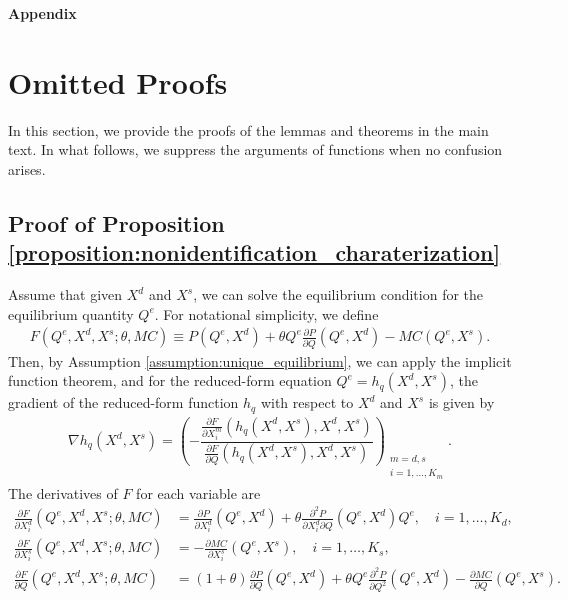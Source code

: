 \documentclass[11pt, a4paper]{article}
\theoremstyle{remark}
\begin{document}
\begin{center}
\huge\textbf{Appendix}
\end{center}
\vspace{1mm}

\section{Omitted Proofs}\label{appendix:proof}
In this section, we provide the proofs of the lemmas and theorems in the main text.
In what follows, we suppress the arguments of functions when no confusion arises.


\subsection{Proof of Proposition \ref{proposition:nonidentification_charaterization}}
Assume that given $X^{d}$ and $X^{s}$, we can solve the equilibrium condition for the equilibrium quantity $Q^e$.
For notational simplicity, we define
\begin{align}
    F(Q^e, X^{d}, X^{s}; \theta, MC) \equiv P(Q^e, X^{d}) + \theta Q^e\frac{\partial P}{\partial Q}(Q^e, X^{d}) - MC(Q^e, X^{s}).
\end{align}
Then, by Assumption \ref{assumption:unique_equilibrium}, we can apply the implicit function theorem, and for the reduced-form equation $Q^e = h_q(X^{d}, X^{s})$, the gradient of the reduced-form function $h_q$ with respect to $X^{d}$ and $X^{s}$ is given by
\begin{align}
    \nabla h_q(X^{d}, X^{s}) =  \left( -\dfrac{\frac{\partial F}{\partial X^{m}_{i}}(h_q(X^{d}, X^{s}), X^{d}, X^{s})}{\frac{\partial F}{\partial Q}(h_q(X^{d}, X^{s}), X^{d}, X^{s})} \right)_{\substack{m = d, s\\ i = 1, \ldots, K_m}}. \label{eq:foc_derivative_demand_supply}
\end{align}
The derivatives of $F$ for each variable are
\begin{align}
    \frac{\partial F}{\partial X^{d}_i}(Q^e, X^{d}, X^{s}; \theta, MC) & =  \frac{\partial P}{\partial X^{d}_{i}}(Q^e, X^{d}) + \theta\frac{\partial^2 P}{\partial X^{d}_{i}\partial Q}(Q^e, X^{d})Q^e, \quad i = 1, \ldots, K_d,\\
    \frac{\partial F}{\partial X^{s}_i}(Q^e, X^{d}, X^{s}; \theta, MC) & =  -\frac{\partial MC}{\partial X^{s}_{i}}(Q^e, X^{s}), \quad i = 1, \ldots, K_s, \\
    \frac{\partial F}{\partial Q}(Q^e, X^{d}, X^{s}; \theta, MC) & = (1+\theta)\frac{\partial P}{\partial Q}(Q^e, X^{d}) + \theta Q^e\frac{\partial^2 P}{\partial Q^2}(Q^e, X^{d}) - \frac{\partial MC}{\partial Q}(Q^e, X^{s}).
\end{align}
\end{document}
